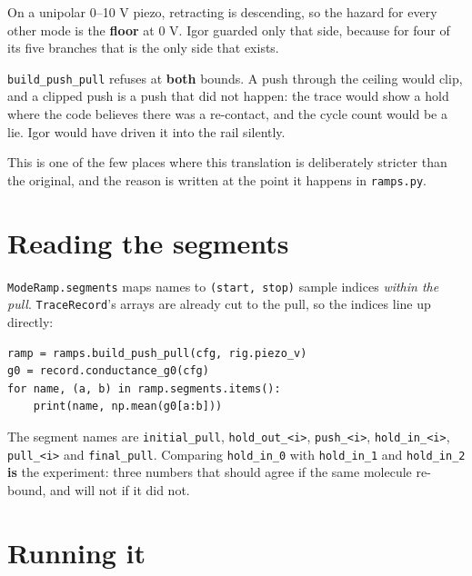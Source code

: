 On a unipolar 0--10 V piezo, retracting is descending, so the hazard for every other mode is the \textbf{floor} at 0 V. Igor guarded only that side, because for four of its five branches that is the only side that exists.

\texttt{build\_\discretionary{}{}{}push\_\discretionary{}{}{}pull} refuses at \textbf{both} bounds. A push through the ceiling would clip, and a clipped push is a push that did not happen: the trace would show a hold where the code believes there was a re-contact, and the cycle count would be a lie. Igor would have driven it into the rail silently.

This is one of the few places where this translation is deliberately stricter than the original, and the reason is written at the point it happens in \texttt{ramps.\discretionary{}{}{}py}.

\section{Reading the segments}

\texttt{Mode\discretionary{}{}{}Ramp.\discretionary{}{}{}segments} maps names to \texttt{(start,\discretionary{}{}{} stop)} sample indices \emph{within the pull}. \texttt{Trace\discretionary{}{}{}Record}'s arrays are already cut to the pull, so the indices line up directly:

\begin{lstlisting}[style=py]
ramp = ramps.build_push_pull(cfg, rig.piezo_v)
g0 = record.conductance_g0(cfg)
for name, (a, b) in ramp.segments.items():
    print(name, np.mean(g0[a:b]))
\end{lstlisting}

The segment names are \texttt{initial\_\discretionary{}{}{}pull}, \texttt{hold\_\discretionary{}{}{}out\_\discretionary{}{}{}<i>}, \texttt{push\_\discretionary{}{}{}<i>}, \texttt{hold\_\discretionary{}{}{}in\_\discretionary{}{}{}<i>}, \texttt{pull\_\discretionary{}{}{}<i>} and \texttt{final\_\discretionary{}{}{}pull}. Comparing \texttt{hold\_\discretionary{}{}{}in\_\discretionary{}{}{}0} with \texttt{hold\_\discretionary{}{}{}in\_\discretionary{}{}{}1} and \texttt{hold\_\discretionary{}{}{}in\_\discretionary{}{}{}2} \textbf{is} the experiment: three numbers that should agree if the same molecule re-bound, and will not if it did not.

\section{Running it}

